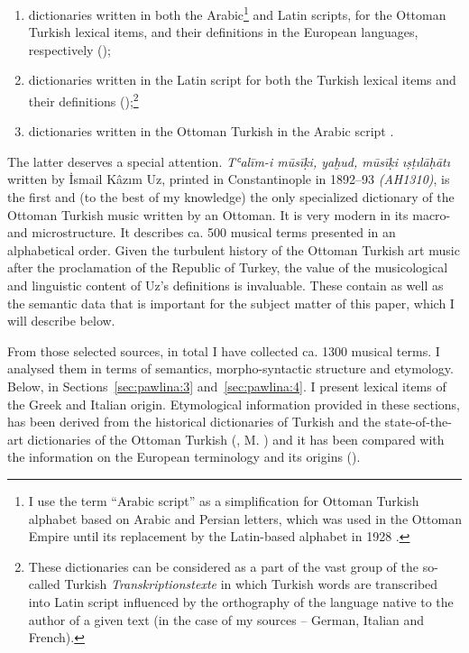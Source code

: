 \documentclass[output=paper,colorlinks,citecolor=brown,arabicfont,chinesefont]{langscibook}
\begin{document}
\begin{enumerate}
    \item dictionaries written in both the Arabic\footnote{I use the term “Arabic script” as a simplification for Ottoman Turkish alphabet based on Arabic and Persian letters, which was used in the Ottoman Empire until its replacement by the Latin-based alphabet in 1928 \citep{Lewis1999}.} and Latin scripts, for the Ottoman Turkish lexical items, and their definitions in the European languages, respectively (\citealt{KiefferBianchi1835, Meninski1680, Sami1885, Redhouse1861, RedhouseSozlugu2017, TinghirSinapian1891});
    \item dictionaries written in the Latin script for both the Turkish lexical items and their definitions (\citealt{Korabinsky1788, Siemieniec-golas2005, Stachowski2002});\footnote{These dictionaries can be considered as a part of the vast group of the so-called Turkish \emph{Transkriptionstexte} \citep[185--86]{Stachowski1995} in which Turkish words are transcribed into Latin script influenced by the orthography of the language native to the author of a given text (in the case of my sources – German, Italian and French).}
    \item dictionaries written in the Ottoman Turkish in the Arabic script \citep{Uz1892}.
\end{enumerate}

The latter deserves a special attention. \emph{Tʿalīm-i mūsīḳi, yaḫud, mūsīḳi ıṣṭılāḥātı} written by İsmail Kâzım Uz, printed in Constantinople in 1892--93 \emph{(AH1310)}, is the first and (to the best of my knowledge) the only specialized dictionary of the Ottoman Turkish music written by an Ottoman. It is very modern in its macro- and microstructure. It describes ca. 500 musical terms presented in an alphabetical order. Given the turbulent history of the Ottoman Turkish art music after the proclamation of the Republic of Turkey, the value of the musicological and linguistic content of Uz’s definitions is invaluable. These contain as well as the semantic data that is important for the subject matter of this paper, which I will describe below.

From those selected sources, in total I have collected ca. 1300 musical terms. I analysed them in terms of semantics, morpho-syntactic structure and etymology. Below, in Sections~\ref{sec:pawlina:3} and~\ref{sec:pawlina:4}. I present lexical items of the Greek and Italian origin. Etymological information provided in these sections, has been derived from the historical dictionaries of Turkish and the state-of-the-art dictionaries of the Ottoman Turkish (\citealt{AksoyDilsin2009, Kubbealti-Lugati, Parlatir2017, RedhouseSozlugu2017}, M. \citealt{Stachowski2019, Tietze2016}) and it has been compared with the information on the European terminology and its origins (\citealt{Dabkowski1991,Dabkowski1997,Dabkowski2004}).
\end{document}
